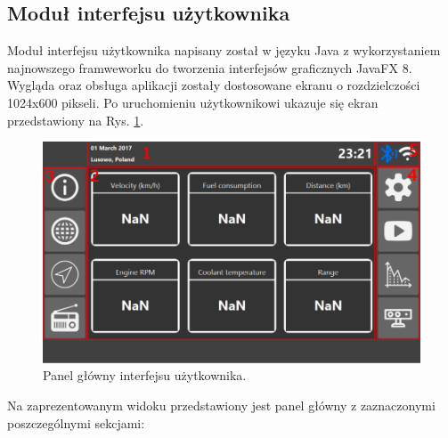 \documentclass[12pt]{article} %
\numberwithin{equation}{subsection}
\numberwithin{figure}{section}
\numberwithin{table}{section}
\begin{document}
		
	
	\newpage
	
	
\subsection{Moduł interfejsu użytkownika}\label{rozdzial_hmi_software}
	\hspace{0.5cm}Moduł interfejsu użytkownika napisany został w języku Java z wykorzystaniem najnowszego framweworku do tworzenia interfejsów graficznych JavaFX 8. Wygląda oraz obsługa aplikacji zostały dostosowane ekranu o rozdzielczości 1024x600 pikseli. Po uruchomieniu użytkownikowi ukazuje się ekran przedstawiony na Rys. \ref{user_interface_dashboard}.
	
		\begin{figure}[!h]
			\centering
			\includegraphics[scale=0.44]{Images/user_interface_dashboard.png}
			\caption{Panel główny interfejsu użytkownika.}
			\label{user_interface_dashboard}
		\end{figure}
		
		Na zaprezentowanym widoku przedstawiony jest panel główny z zaznaczonymi poszczególnymi sekcjami:
		
\end{document}
